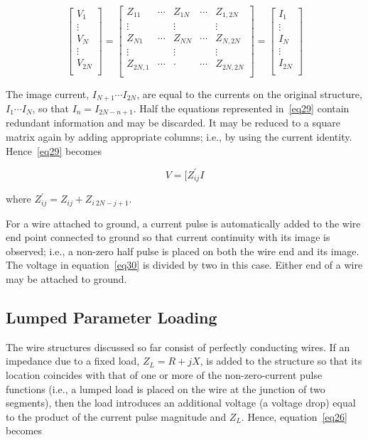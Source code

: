 \documentclass[12pt]{article}
\begin{document}
\begin{equation}
\left[
\begin{array}{l}
V_1    \\
\vdots \\
V_N    \\
\vdots \\
V_{2N} \\
\end{array}
\right]
=
\left[
\begin{array}{lllll}
Z_{11}   & \cdots & Z_{1N} & \cdots & Z_{1,2N}  \\
\vdots   &        &\vdots  &        & \vdots    \\
Z_{N1}   & \cdots & Z_{NN} & \cdots & Z_{N,2N}  \\
\vdots   &        &\vdots  &        & \vdots    \\
Z_{2N,1} & \cdots &\cdot   & \cdots & Z_{2N,2N} \\
\end{array}
\right]
=
\left[
\begin{array}{l}
I_1    \\
\vdots \\
I_N    \\
\vdots \\
I_{2N}    \\
\end{array}
\right]
\label{eq29}
\end{equation}

The image current, $I_{N+1}\cdots I_{2N}$, are equal to the currents on
the original structure, $I_1\cdots I_N$, so that $I_n = I_{2N-n+1}$. Half
the equations represented in~\eqref{eq29} contain redundant information
and may be discarded. It may be reduced to a square matrix again by
adding appropriate columns; i.e., by using the current identity.
Hence~\eqref{eq29} becomes

\begin{equation}
V=[Z^\prime_{ij}I
\label{eq30}
\end{equation}

where $Z^\prime_{ij} = Z_{ij} + Z_{i\ 2N-j+1}$.

For a wire attached to ground, a current pulse is automatically added to
the wire end point connected to ground so that current continuity with
its image is observed; i.e., a non-zero half pulse is placed on both the
wire end and its image. The voltage in equation~\eqref{eq30} is divided
by two in this case. Either end of a wire may be attached to ground.

\subsection{Lumped Parameter Loading}
The wire structures discussed so far consist of perfectly conducting
wires. If an impedance due to a fixed load, $Z_L = R + jX$, is added to
the structure so that its location coincides with that of one or more of
the non-zero-current pulse functions (i.e., a lumped load is placed on
the wire at the junction of two segments), then the load introduces an
additional voltage (a voltage drop) equal to the product of the current
pulse magnitude and $Z_L$. Hence, equation~\eqref{eq26} becomes
\end{document}
